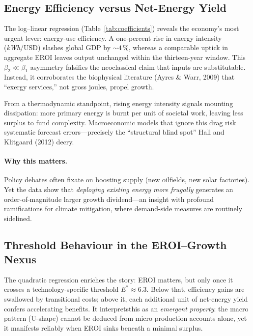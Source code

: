 \documentclass[a4paper,12pt]{article}
\begin{document}
\subsection{Energy Efficiency versus Net-Energy Yield}
\label{sec:disc_efficiency}

The log–linear regression (Table~\ref{tab:coefficients}) reveals the economy’s
most urgent lever: energy-use efficiency.  A one-percent rise in energy
intensity (\textit{kWh}/USD) slashes global GDP by \(\sim4\,\%\), whereas a
comparable uptick in aggregate EROI leaves output unchanged within the
thirteen-year window.  This \(\beta_2\!\ll\!\beta_1\) asymmetry falsifies the neoclassical claim that inputs are substitutable.  Instead, it corroborates the biophysical literature (Ayres \& Warr, 2009) that “exergy services,” not gross joules, propel growth.  

From a thermodynamic standpoint, rising energy intensity signals mounting
dissipation: more primary energy is burnt per unit of societal work, leaving
less surplus to fund complexity.  Macroeconomic models that ignore this drag
risk systematic forecast errors—precisely the “structural blind spot” Hall and
Klitgaard (2012) decry.

\paragraph{Why this matters.}
Policy debates often fixate on boosting supply (new oilfields, new solar
factories).  Yet the data show that \emph{deploying existing energy more
frugally} generates an order-of-magnitude larger growth dividend—an insight
with profound ramifications for climate mitigation, where demand-side measures
are routinely sidelined.

\subsection{Threshold Behaviour in the EROI–Growth Nexus}
\label{sec:disc_threshold}

The quadratic regression enriches the story: EROI matters, but only once it
crosses a technology-specific threshold
\(E^{*}\!\approx\!6.3\).  Below that, efficiency gains are swallowed by
transitional costs; above it, each additional unit of net-energy yield confers
accelerating benefits. It interpretsthis as an
\emph{emergent property}: the macro pattern (U-shape) cannot be deduced from
micro production accounts alone, yet it manifests reliably when EROI sinks
beneath a minimal surplus.
\end{document}
